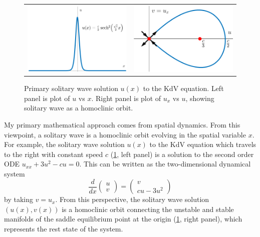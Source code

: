 \documentclass[12pt,reqno,oneside,hidelinks]{article}
\begin{document}
\begin{figure}[H]
    \centering
    \begin{tabular}{cc}
        \includegraphics[width=6cm]{images/KdVsolitoneq.png} \hspace{2cm} &
        \includegraphics[width=6cm]{images/KdVphaseportait.png} 
    \end{tabular}
    \caption{Primary solitary wave solution $u(x)$ to the KdV equation. Left panel is plot of $u$ vs $x$. Right panel is plot of $u_x$ vs $u$, showing solitary wave as a homoclinic orbit.}
    \label{fig:kdvpp}
\end{figure}

My primary mathematical approach comes from spatial dynamics. From this viewpoint, a solitary wave is a homoclinic orbit evolving in the spatial variable $x$. For example, the solitary wave solution $u(x)$ to the KdV equation which travels to the right with constant speed $c$ (\cref{fig:kdvpp}, left panel) is a solution to the second order ODE $u_{xx} + 3 u^2 - c u = 0$. This can be written as the two-dimensional dynamical system 
\[
\frac{d}{dx}\begin{pmatrix}u\\v\end{pmatrix}
= \begin{pmatrix}v \\ cu - 3u^2\end{pmatrix}
\]
by taking $v = u_x$. From this perspective, the solitary wave solution $(u(x), v(x))$ is a homoclinic orbit connecting the unstable and stable manifolds of the saddle equilibrium point at the origin (\cref{fig:kdvpp}, right panel), which represents the rest state of the system. 
\end{document}
